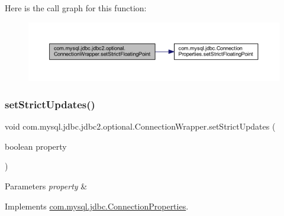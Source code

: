 Here is the call graph for this function\+:
\nopagebreak
\begin{figure}[H]
\begin{center}
\leavevmode
\includegraphics[width=350pt]{classcom_1_1mysql_1_1jdbc_1_1jdbc2_1_1optional_1_1_connection_wrapper_a1549974fcca3a76425ac6155e2ae77c8_cgraph}
\end{center}
\end{figure}
\mbox{\label{classcom_1_1mysql_1_1jdbc_1_1jdbc2_1_1optional_1_1_connection_wrapper_afcbd497f79720ae946cda438dad6ec65}} 
\subsubsection{\texorpdfstring{set\+Strict\+Updates()}{setStrictUpdates()}}
{\footnotesize\ttfamily void com.\+mysql.\+jdbc.\+jdbc2.\+optional.\+Connection\+Wrapper.\+set\+Strict\+Updates (\begin{DoxyParamCaption}\item[{boolean}]{property }\end{DoxyParamCaption})}


\begin{DoxyParams}{Parameters}
{\em property} & \\
\hline
\end{DoxyParams}


Implements \mbox{\hyperlink{interfacecom_1_1mysql_1_1jdbc_1_1_connection_properties_a6b1583c38f50feb05d85d5f8357a998c}{com.\+mysql.\+jdbc.\+Connection\+Properties}}.

